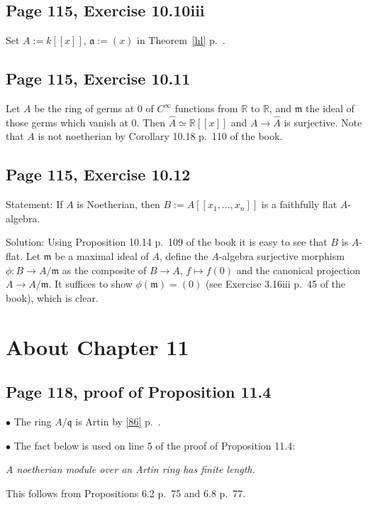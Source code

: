 \documentclass[parskip=half,fontsize=12pt]{scrartcl}%
\newcommand{\mf}{\mathfrak}
\newcommand{\aaa}{\mf a}
\newcommand{\mmm}{\mf m}
\newcommand{\nnn}{\mf n}
\newcommand{\bu}{\bullet}
\begin{document}
\subsection{Page 115, Exercise 10.10iii}%

Set $A:=k[[x]]$, $\aaa:=(x)$ in Theorem~\ref{hl} p.~\pageref{hl}. 

\subsection{Page 115, Exercise 10.11}%

Let $A$ be the ring of germs at $0$ of $C^\infty$ functions from $\mathbb R$ to $\mathbb R$, and $\mmm$ the ideal of those germs which vanish at $0$. Then $\widehat A\simeq\mathbb R[[x]]$ and $A\to\widehat A$ is surjective. Note that $A$ is not noetherian by Corollary 10.18 p.~110 of the book. 

\subsection{Page 115, Exercise 10.12}%

Statement: If $A$ is Noetherian, then $B:=A[[x_1,\ldots,x_n]]$ is a faithfully flat $A$-algebra. 

Solution: Using Proposition 10.14 p.~109 of the book it is easy to see that $B$ is $A$-flat. Let $\mmm$ be a maximal ideal of $A$, define the $A$-algebra surjective morphism $\phi:B\to A/\mmm$ as the composite of $B\to A$, $f\mapsto f(0)$ and the canonical projection $A\to A/\mmm$. %
It suffices to show $\phi(\mmm)=(0)$ (see Exercise 3.16iii p.~45 of the book), which is clear. 

\section{About Chapter 11}%

\subsection{Page 118, proof of Proposition 11.4}%

$\bu$ The ring $A/\mf q$ is Artin by \eqref{86} p.~\pageref{86}.

$\bu$ The fact below is used on line 5 of the proof of Proposition 11.4:

\emph{A noetherian module over an Artin ring has finite length.}

This follows from Propositions 6.2 p.~75 and 6.8 p.~77.
\end{document}
